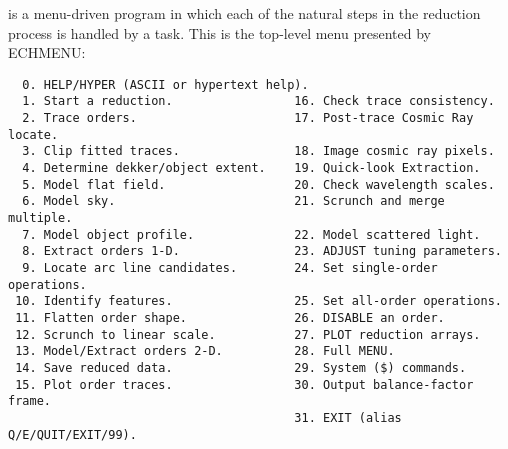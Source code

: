  is a menu-driven program in which each of
the natural steps in the reduction process is handled by a task.
This is the top-level menu presented by ECHMENU:

\begin{latex}
\begin{verbatim}
  0. HELP/HYPER (ASCII or hypertext help).
  1. Start a reduction.                 16. Check trace consistency.
  2. Trace orders.                      17. Post-trace Cosmic Ray locate.
  3. Clip fitted traces.                18. Image cosmic ray pixels.
  4. Determine dekker/object extent.    19. Quick-look Extraction.
  5. Model flat field.                  20. Check wavelength scales.
  6. Model sky.                         21. Scrunch and merge multiple.
  7. Model object profile.              22. Model scattered light.
  8. Extract orders 1-D.                23. ADJUST tuning parameters.
  9. Locate arc line candidates.        24. Set single-order operations.
 10. Identify features.                 25. Set all-order operations.
 11. Flatten order shape.               26. DISABLE an order.
 12. Scrunch to linear scale.           27. PLOT reduction arrays.
 13. Model/Extract orders 2-D.          28. Full MENU.
 14. Save reduced data.                 29. System ($) commands.
 15. Plot order traces.                 30. Output balance-factor frame.
                                        31. EXIT (alias Q/E/QUIT/EXIT/99).
\end{verbatim}
\end{latex}
